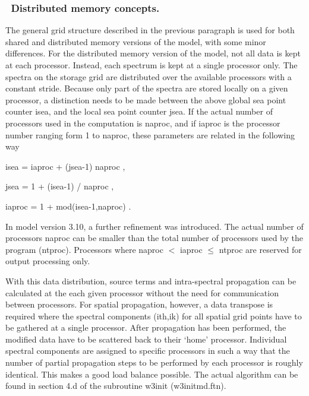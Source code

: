 \vsssub
\subsubsection{~Distributed memory concepts.} \label{sec:distr}
\vsssub

The general grid structure described in the previous paragraph is used for
both shared and distributed memory versions of the model, with some minor
differences. For the distributed memory version of the model, not all data is
kept at each processor. Instead, each spectrum is kept at a single processor
only. The spectra on the storage grid are distributed over the available
processors with a constant stride. Because only part of the spectra are stored
locally on a given processor, a distinction needs to be made between the above
global sea point counter {\F isea}, and the local sea point counter {\F
jsea}. If the actual number of processors used in the computation is {\F
naproc}, and if {\F iaproc} is the processor number ranging form 1 to {\F
naproc}, these parameters are related in the following way

\vspace{\baselineskip}
\centerline{\F isea = iaproc + (jsea-1) naproc ,}
\centerline{\F jsea = 1 + (isea-1) / naproc ,}
\centerline{\F iaproc = 1 + mod(isea-1,naproc) .}
\vspace{\baselineskip}

\noindent
In model version 3.10, a further refinement was introduced. The actual number
of processors {\F naproc} can be smaller than the total number of processors
used by the program ({\F ntproc}). Processors where {\F naproc} $<$ {\F
iaproc} $\le$ {\F ntproc} are reserved for output processing only.

With this data distribution, source terms and intra-spectral propagation can
be calculated at the each given processor without the need for communication
between processors. For spatial propagation, however, a data transpose is
required where the spectral components {\F(ith,ik)} for all spatial grid
points have to be gathered at a single processor. After propagation has been
performed, the modified data have to be scattered back to their `home'
processor. Individual spectral components are assigned to specific processors
in such a way that the number of partial propagation steps to be performed by
each processor is roughly identical. This makes a good load balance
possible. The actual algorithm can be found in section 4.d of the subroutine
{\F w3init} ({\file w3initmd.ftn}).

